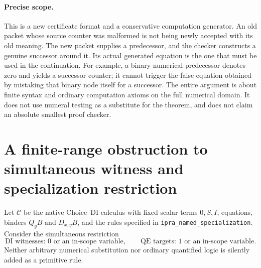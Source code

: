 \documentclass[11pt,letterpaper]{article}
\theoremstyle{definition}\newtheorem{definition}[theorem]{Definition}
\theoremstyle{remark}\newtheorem{remark}[theorem]{Remark}
\begin{document}
\paragraph{Precise scope.}
This is a new certificate format and a conservative computation generator.
An old packet whose source counter was malformed is not being newly
accepted with its old meaning.  The new packet supplies a predecessor,
and the checker constructs a genuine successor around it.  Its actual
generated equation is the one that must be used in the continuation.
For example, a binary numerical predecessor denotes zero and yields a
successor counter; it cannot trigger the false equation obtained by
mistaking that binary node itself for a successor.  The entire argument
is about finite syntax and ordinary computation axioms on the full
numerical domain.  It does not use numeral testing as a substitute for
the theorem, and does not claim an absolute smallest proof checker.


\section{A finite-range obstruction to simultaneous witness and specialization restriction}
\label{sec:finite-restriction}
Let $\mathcal C$ be the native Choice--DI calculus with fixed scalar terms
$0,S,I$, equations, binders $Q_yB$ and $D_{x,y}B$, and the rules specified in
\texttt{ipra\_named\_specialization}. Consider the simultaneous restriction
\[
\text{DI witnesses: }0\text{ or an in-scope variable},\qquad
\text{QE targets: }1\text{ or an in-scope variable}.
\tag{R}
\]
Neither arbitrary numerical substitution nor ordinary quantified logic
is silently added as a primitive rule.
\end{document}
